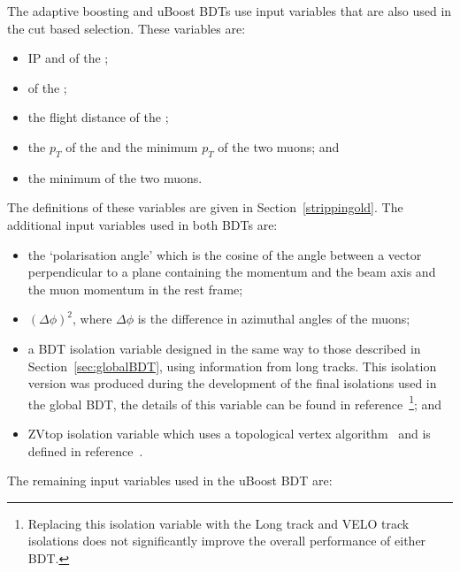 The adaptive boosting and uBoost BDTs use input variables that are also used in the cut based selection. These variables are:
\begin{itemize}
\item IP and \chiIP of the \bs;
\item \chivtx of the \bs; 
\item the flight distance of the \bs;
\item the $p_T$ of the \bs and the minimum $p_T$ of the two muons; and
\item the minimum \chiIP of the two muons.
\end{itemize}
The definitions of these variables are given in Section~\ref{strippingold}. The additional input variables used in both BDTs are: %
\begin{itemize}
\item  the `polarisation angle' which is the cosine of the angle between a vector perpendicular to a plane containing the \bs momentum and the beam axis and the muon momentum in the \bs rest frame; 
\item $(\Delta \phi)^{2}$, where $\Delta \phi$ is the difference in azimuthal angles of the muons;
\item a BDT isolation variable designed in the same way to those described in Section~\ref{sec:globalBDT}, using information from long tracks. This isolation version was produced during the development of the final isolations used in the global BDT, the details of this variable can be found in reference~\cite{Archilli:1970886}\footnote{Replacing this isolation variable with the Long track and VELO track isolations does not significantly improve the overall performance of either BDT.}; and
\item ZVtop isolation variable which uses a topological vertex algorithm~\cite{Jackson:1996sy} and is defined in reference~\cite{Morda:2120795}.
\end{itemize}
The remaining input variables used in the uBoost BDT are:
